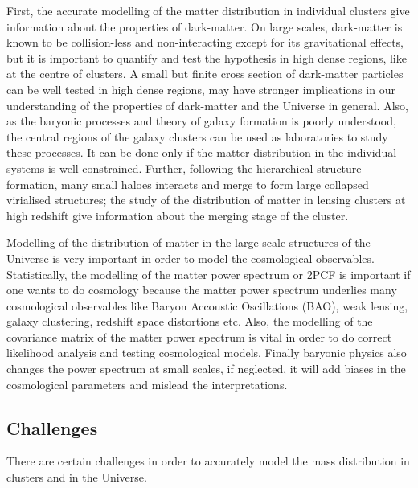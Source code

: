 First, the accurate modelling of the matter distribution in individual clusters
give information about the properties of dark-matter. On large scales, dark-matter
is known to be collision-less and non-interacting except for its gravitational effects,
but it is important to quantify and test the hypothesis in high dense regions, like
at the centre of clusters. A small but finite cross section of dark-matter particles
can be well tested in high dense regions, may have stronger implications in our 
understanding of the properties of dark-matter and the Universe in general.  
Also, as the baryonic processes and theory of galaxy
formation is poorly understood, the central regions of the galaxy clusters can be 
used as laboratories to study these processes. It can be done only if the matter 
distribution in the individual systems is well constrained. 
Further, following the hierarchical structure formation, many small haloes interacts and
merge to form large collapsed virialised structures; the study of the distribution of 
matter in lensing clusters at high redshift give information about the merging
stage of the cluster. 

Modelling of the distribution of matter in the large scale structures of the  
Universe is very important
in order to model the cosmological observables. Statistically, the modelling of the
matter power spectrum or 2PCF is important if one wants to do cosmology because 
the matter power spectrum underlies many
cosmological observables like Baryon Accoustic Oscillations (BAO), 
weak lensing, galaxy clustering, redshift
space distortions etc. Also, the modelling of the 
covariance matrix of the matter power spectrum is vital in order to do correct
likelihood analysis and testing cosmological models. Finally baryonic physics 
also changes the power spectrum at small scales, if neglected, it will add biases
in the cosmological parameters and mislead the interpretations. 

\subsection{Challenges}

There are certain challenges in order to accurately model the mass distribution
in clusters and in the Universe. 

